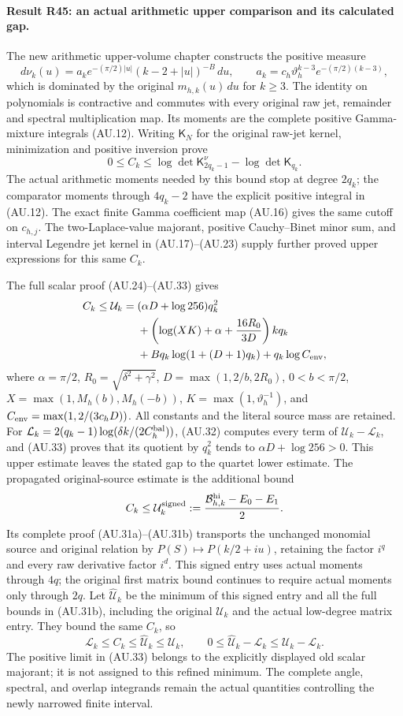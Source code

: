 \paragraph{Result R45: an actual arithmetic upper comparison and its calculated gap.}
The new arithmetic upper-volume chapter constructs the positive
measure
\[
 d\nu_k(u)=a_k e^{-(\pi/2)|u|}(k-2+|u|)^{-B}\,du,
 \qquad a_k=c_h\vartheta_h^{k-3}e^{-(\pi/2)(k-3)},
\]
which is dominated by the original $m_{h,k}(u)\,du$ for $k\ge3$.
The identity on polynomials is contractive and commutes with every
original raw jet, remainder and spectral multiplication map.
Its moments are the complete positive Gamma-mixture integrals
(AU.12). Writing $\mathsf K_N$ for the original raw-jet kernel,
minimization and positive inversion prove
\[
 0\le C_k\le
 \log\det\mathsf K_{2q_k-1}^{\nu}
       -\log\det\mathsf K_{q_k}.
\]
The actual arithmetic moments needed by this bound stop at degree
$2q_k$; the comparator moments through $4q_k-2$ have the explicit
positive integral in (AU.12). The exact finite Gamma coefficient
map (AU.16) gives the same cutoff on $c_{h,j}$.
The two-Laplace-value majorant, positive Cauchy--Binet minor sum,
and interval Legendre jet kernel in (AU.17)--(AU.23) supply
further proved upper expressions for this same $C_k$.

The full scalar proof (AU.24)--(AU.33) gives
\begin{align*}
 C_k\le\mathcal U_k={}&(\alpha D+\log256)q_k^2\\
 &+\left(\log(XK)+\alpha+\frac{16R_0}{3D}\right)kq_k\\
 &+Bq_k\log(1+(D+1)q_k)+q_k\log C_{\rm env},
\end{align*}
where $\alpha=\pi/2$, $R_0=\sqrt{\delta^2+\gamma^2}$,
$D=\max(1,2/b,2R_0)$, $0<b<\pi/2$,
$X=\max(1,M_h(b),M_h(-b))$, $K=\max(1,\vartheta_h^{-1})$,
and $C_{\rm env}=\max(1,2/(3c_hD))$.
All constants and the literal source mass are retained. For
$\mathcal L_k=2(q_k-1)\log(\delta k/(2C_h^{\rm bal}))$,
(AU.32) computes every term of $\mathcal U_k-\mathcal L_k$,
and (AU.33) proves that its quotient by $q_k^2$ tends to
$\alpha D+\log256>0$. This upper estimate leaves the stated
gap to the quartet lower estimate.
The propagated original-source estimate is the additional bound
\[
 C_k\le\mathcal U_k^{\rm signed}
   :=\frac{\mathcal B_{h,k}^{\rm hi}-E_0-E_1}{2}.
\]
Its complete proof (AU.31a)--(AU.31b) transports the unchanged monomial
source and original relation by $P(S)\mapsto P(k/2+iu)$, retaining
the factor $i^q$ and every raw derivative factor $i^d$. This signed
entry uses actual moments through $4q$; the original first matrix
bound continues to require actual moments only through $2q$.
Let $\widehat{\mathcal U}_k$ be the minimum of this signed entry
and all the full bounds in (AU.31b), including the original
$\mathcal U_k$ and the actual low-degree matrix entry. They bound
the same $C_k$, so
\[
 \mathcal L_k\le C_k\le\widehat{\mathcal U}_k\le\mathcal U_k,
 \qquad
 0\le\widehat{\mathcal U}_k-\mathcal L_k
       \le\mathcal U_k-\mathcal L_k.
\]
The positive limit in (AU.33) belongs to the explicitly displayed
old scalar majorant; it is not assigned to this refined minimum.
The complete angle, spectral, and overlap integrands remain the
actual quantities controlling the newly narrowed finite interval.

